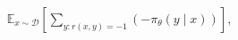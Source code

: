 \documentclass[preview]{standalone}
\begin{document}
\begin{align*}
\mathbb{E}_{x \sim \mathcal{D}}\!\left[\sum_{y : r(x,y)=-1}(-\pi_\theta(y \mid x))\right],
\end{align*}
\end{document}
